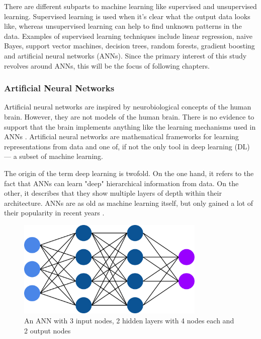 There are different subparts to machine learning like supervised and unsupervised learning. Supervised learning is used when it's clear what the output data looks like, whereas unsupervised learning can help to find unknown patterns in the data. Examples of supervised learning techniques include linear regression, naive Bayes, support vector machines, decision trees, random forests, gradient boosting and artificial neural networks (ANNs). Since the primary interest of this study revolves around ANNs, this will be the focus of following chapters.

\subsubsection{Artificial Neural Networks}

Artificial neural networks are inspired by neurobiological concepts of the human brain. However, they are not models of the human brain. There is no evidence to support that the brain implements anything like the learning mechanisms used in ANNs \cite{Chollet2017}. Artificial neural networks are mathematical frameworks for learning representations from data and one of, if not the only tool in deep learning (DL) --- a subset of machine learning.

The origin of the term deep learning is twofold. On the one hand, it refers to the fact that ANNs can learn "deep" hierarchical information from data. On the other, it describes that they show multiple layers of depth within their architecture. ANNs are as old as machine learning itself, but only gained a lot of their popularity in recent years \cite{Chollet2017}.

\begin{figure}[H]
\centering
\par
\includegraphics[width=0.8\textwidth]{imgs/ann.png}
\caption{An ANN with 3 input nodes, 2 hidden layers with 4 nodes each and 2 output nodes}
\par
\end{figure}

